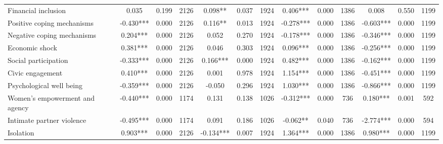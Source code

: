\begin{tabular}{l*{12}{c}}
 Financial inclusion &        0.035 &        0.199 & 2126    &        0.098** &        0.037 & 1924    &        0.406*** &        0.000 & 1386 &        0.008 &        0.550 & 1199 \\ 

 Positive coping mechanisms &       -0.430*** &        0.000 & 2126    &        0.116** &        0.013 & 1924    &       -0.278*** &        0.000 & 1386 &       -0.603*** &        0.000 & 1199 \\ 

 Negative coping mechanisms &        0.204*** &        0.000 & 2126    &        0.052 &        0.270 & 1924    &       -0.178*** &        0.000 & 1386 &       -0.346*** &        0.000 & 1199 \\ 

 Economic shock &        0.381*** &        0.000 & 2126    &        0.046 &        0.303 & 1924    &        0.096*** &        0.000 & 1386 &       -0.256*** &        0.000 & 1199 \\ 

 Social participation &       -0.333*** &        0.000 & 2126    &        0.166*** &        0.000 & 1924    &        0.482*** &        0.000 & 1386 &       -0.162*** &        0.000 & 1199 \\ 

 Civic engagement &        0.410*** &        0.000 & 2126    &        0.001 &        0.978 & 1924    &        1.154*** &        0.000 & 1386 &       -0.451*** &        0.000 & 1199 \\ 

 Psychological well being &       -0.359*** &        0.000 & 2126    &       -0.050 &        0.296 & 1924    &        1.030*** &        0.000 & 1386 &       -0.866*** &        0.000 & 1199 \\ 

 Women's empowerment and agency &       -0.440*** &        0.000 & 1174    &        0.131 &        0.138 & 1026    &       -0.312*** &        0.000 & 736 &        0.180*** &        0.001 & 592 \\ 

 Intimate partner violence &       -0.495*** &        0.000 & 1174    &        0.091 &        0.186 & 1026    &       -0.062** &        0.040 & 736 &       -2.774*** &        0.000 & 594 \\ 

 Isolation &        0.903*** &        0.000 & 2126    &       -0.134*** &        0.007 & 1924    &        1.364*** &        0.000 & 1386 &        0.980*** &        0.000 & 1199 \\ 


\end{tabular}

